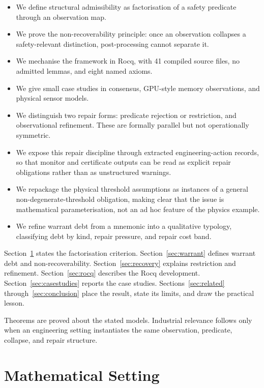 \documentclass[a4paper,11pt]{article}
\begin{document}
\begin{itemize}
\item We define structural admissibility as factorisation of a safety predicate
through an observation map.
\item We prove the non-recoverability principle: once an observation collapses a
safety-relevant distinction, post-processing cannot separate it.
\item We mechanise the framework in Rocq, with 41 compiled source files, no
admitted lemmas, and eight named axioms.
\item We give small case studies in consensus, GPU-style memory observations,
and physical sensor models.
\item We distinguish two repair forms: predicate rejection or restriction, and
observational refinement. These are formally parallel but not operationally
symmetric.
\item We expose this repair discipline through extracted engineering-action
records, so that monitor and certificate outputs can be read as explicit repair
obligations rather than as unstructured warnings.
\item We repackage the physical threshold assumptions as instances of a
general non-degenerate-threshold obligation, making clear that the issue is
mathematical parameterisation, not an ad hoc feature of the physics example.
\item We refine warrant debt from a mnemonic into a qualitative typology,
classifying debt by kind, repair pressure, and repair cost band.
\end{itemize}

Section~\ref{sec:setting} states the factorisation criterion.
Section~\ref{sec:warrant} defines warrant debt and non-recoverability.
Section~\ref{sec:recovery} explains restriction and refinement.
Section~\ref{sec:rocq} describes the Rocq development.
Section~\ref{sec:casestudies} reports the case studies.
Sections~\ref{sec:related} through~\ref{sec:conclusion} place the result,
state its limits, and draw the practical lesson.

Theorems are proved about the stated models. Industrial relevance follows only
when an engineering setting instantiates the same observation, predicate,
collapse, and repair structure.

\section{Mathematical Setting}
\label{sec:setting}
\end{document}
